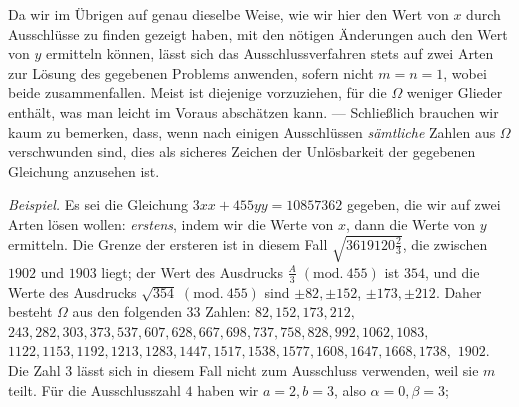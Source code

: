 Da wir im Übrigen auf genau dieselbe Weise, wie wir hier den Wert von \(x\) durch Ausschlüsse zu finden gezeigt haben, mit den nötigen Änderungen auch den Wert von \(y\) ermitteln können, lässt sich das Ausschlussverfahren stets auf zwei Arten zur Lösung des gegebenen Problems anwenden, sofern nicht \(m=n=1\), wobei beide zusammenfallen. Meist ist diejenige vorzuziehen, für die \(\Omega\) weniger Glieder enthält, was man leicht im Voraus abschätzen kann. — Schließlich brauchen wir kaum zu bemerken, dass, wenn nach einigen Ausschlüssen \textit{sämtliche} Zahlen aus \(\Omega\) verschwunden sind, dies als sicheres Zeichen der Unlösbarkeit der gegebenen Gleichung anzusehen ist.

\textit{Beispiel.} Es sei die Gleichung \(3xx+455yy=10857362\) gegeben, die wir auf zwei Arten lösen wollen: \textit{erstens}, indem wir die Werte von \(x\), dann die Werte von \(y\) ermitteln. Die Grenze der ersteren ist in diesem Fall \(\surd{3619120\frac23}\), die zwischen \(1902\) und \(1903\) liegt; der Wert des Ausdrucks \(\frac A3\; (\mathrm{mod}.\ 455)\) ist \(354\), und die Werte des Ausdrucks \(\surd{354}\; (\mathrm{mod}.\ 455)\) sind \(\pm82,\allowbreak \pm152\), \(\pm173,\allowbreak \pm212\). Daher besteht \(\Omega\) aus den folgenden \(33\) Zahlen: \(82,\allowbreak 152,\allowbreak 173,\allowbreak 212,\allowbreak \) \(243,\allowbreak 282,\allowbreak 303,\allowbreak 373,\allowbreak 537,\allowbreak 607,\allowbreak 628,\allowbreak 667,\allowbreak 698,\allowbreak 737,\allowbreak 758,\allowbreak 828,\allowbreak 992,\allowbreak 1062,\allowbreak 1083,\allowbreak \) \(1122,\allowbreak 1153,\allowbreak 1192,\allowbreak 1213,\allowbreak 1283,\allowbreak 1447,\allowbreak 1517,\allowbreak 1538,\allowbreak 1577,\allowbreak 1608,\allowbreak 1647,\allowbreak 1668,\allowbreak 1738,\allowbreak \) \(1902\). Die Zahl \(3\) lässt sich in diesem Fall nicht zum Ausschluss verwenden, weil sie \(m\) teilt. Für die Ausschlusszahl \(4\) haben wir \(a=2,\allowbreak b=3\), also \(\alpha=0,\allowbreak \beta=3\);
